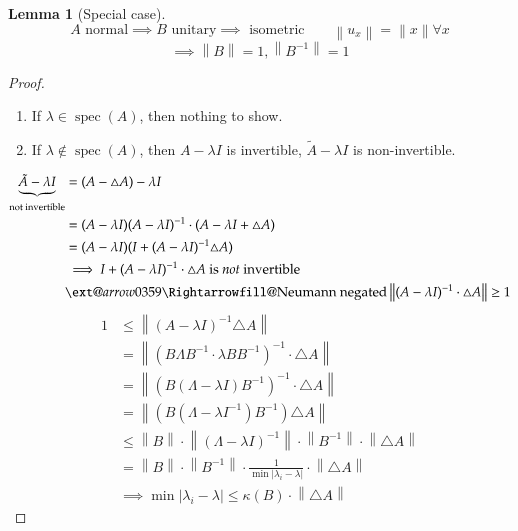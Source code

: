 \documentclass[a4paper]{article}
\makeatletter
\newcounter{lecref}[section]
\numberwithin{lecref}{section}
\newtheorem{lemma}[lecref]{Lemma}
\newcommand{\norm}[1]{\left\|#1\right\|}
\newcommand{\card}[1]{\left|#1\right|}
\newcommand{\xRightarrow}[2][]{\ext@arrow 0359\Rightarrowfill@{#1}{#2}}
\makeatother
\begin{document}
\begin{lemma}[Special case]
  \[ A \text{ normal} \implies B \text{ unitary} \implies \text{ isometric} \qquad \norm{u_x} = \norm{x} \forall x \]
  \[ \implies \norm{B} = 1, \norm{B^{-1}} = 1 \]
\end{lemma}
\begin{proof}
  \begin{enumerate}
    \item If $\lambda \in \operatorname{spec}(A)$, then nothing to show.
    \item If $\lambda \not\in \operatorname{spec}(A)$, then $A - \lambda I$ is invertible, $\tilde A - \lambda I$ is non-invertible.
  \end{enumerate}
  \begin{align*}
    \underbrace{\tilde A - \lambda I}_{\text{not invertible}}
      &= (A - \triangle A) - \lambda I \\
      &= (A - \lambda I)(A - \lambda I)^{-1} \cdot (A - \lambda I + \triangle A) \\
      &= (A - \lambda I)(I + (A - \lambda I)^{-1} \triangle A) \\
      &\implies I + (A - \lambda I)^{-1} \cdot \triangle A \text{ is \emph{not} invertible} \\
      &\xRightarrow{\text{Neumann negated}} \norm{(A - \lambda I)^{-1} \cdot \triangle A} \geq 1
  \end{align*}
  \begin{align*}
    1 &\leq \norm{(A - \lambda I)^{-1} \triangle A} \\
      &= \norm{(B \Lambda B^{-1} \cdot \lambda BB^{-1})^{-1} \cdot \triangle A} \\
      &= \norm{\left(B \left(\Lambda - \lambda I\right) B^{-1}\right)^{-1} \cdot \triangle A} \\
      &= \norm{(B (\Lambda - \lambda I^{-1}) B^{-1}) \triangle A} \\
      &\leq \norm{B} \cdot \norm{(\Lambda - \lambda I)^{-1}} \cdot \norm{B^{-1}} \cdot \norm{\triangle A} \\
      &= \norm{B} \cdot \norm{B^{-1}} \cdot \frac{1}{\min\card{\lambda_i - \lambda}} \cdot \norm{\triangle A} \\
      &\implies \min\card{\lambda_i - \lambda} \leq \kappa(B) \cdot \norm{\triangle A}
  \end{align*}


\end{proof}
\end{document}
